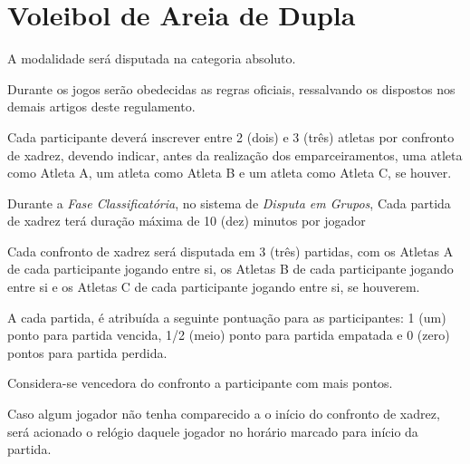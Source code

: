 {\let\clearpage\relax \chapter{Voleibol de Areia de Dupla}}

\begin{article}
	A modalidade será disputada na categoria absoluto.
\end{article}

\begin{article}
	Durante os jogos serão obedecidas as regras oficiais, ressalvando os dispostos nos demais artigos deste regulamento.
\end{article}

\begin{article}
	Cada participante deverá inscrever entre 2 (dois) e 3 (três) atletas por confronto de xadrez, devendo indicar, antes da realização dos emparceiramentos, uma atleta como Atleta A, um atleta como Atleta B e um atleta como Atleta C, se houver.
\end{article}

\begin{article}
	Durante a \textit{Fase Classificatória}, no sistema de \textit{Disputa em Grupos}, Cada partida de xadrez terá duração máxima de 10 (dez) minutos por jogador
\end{article}

\begin{article}
	Cada confronto de xadrez será disputada em 3 (três) partidas, com os Atletas A de cada participante jogando entre si, os Atletas B de cada participante jogando entre si e os Atletas C de cada participante jogando entre si, se houverem.

	\begin{xparagraph}
		A cada partida, é atribuída a seguinte pontuação para as participantes: 1 (um) ponto para partida vencida, 1/2 (meio) ponto para partida empatada e 0 (zero) pontos para partida perdida.
	\end{xparagraph}

	\begin{xparagraph}
		Considera-se vencedora do confronto a participante com mais pontos.
	\end{xparagraph}

	\begin{xparagraph}
		Caso algum jogador não tenha comparecido a o início do confronto de xadrez, será acionado o relógio daquele jogador no horário marcado para início da partida.
	\end{xparagraph}
\end{article}

